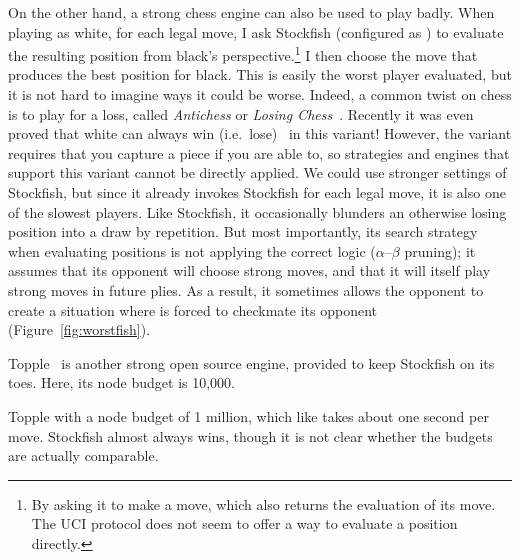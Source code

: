 \documentclass[10pt,preprint,twocolumn]{acmart}
\begin{document}
 On the other hand, a strong chess engine
can also be used to play badly. When playing as white, for each legal
move, I ask Stockfish (configured as ) to evaluate
the resulting position from black's perspective.\footnote{By asking it
  to make a move, which also returns the evaluation of its move. The
  UCI protocol does not seem to offer a way to evaluate a position
  directly.} I then choose the move that produces the best position
for black. This is easily the worst player evaluated, but it is not
hard to imagine ways it could be worse. Indeed, a common twist on
chess is to play for a loss, called {\it Antichess} or {\it Losing
  Chess}~\cite{wikipedialosingchess}. Recently it was even proved that
white can always win (i.e.~lose)~\cite{watkins2017losing} in this
variant! However, the variant requires that you capture a piece if
you are able to, so strategies and engines that support this variant
cannot be directly applied.
We could use stronger settings of Stockfish, but since it already
invokes Stockfish for each legal move, it is also one of the slowest
players. Like Stockfish, it occasionally blunders an otherwise losing
position into a draw by repetition. But most importantly, its search
strategy when evaluating positions is not applying the correct logic
($\alpha$--$\beta$ pruning); it assumes that its opponent will choose
strong moves, and that it will itself play strong moves in future
plies. As a result, it sometimes allows the opponent to create a
situation where  is forced to checkmate its opponent
(Figure~\ref{fig:worstfish}).

 Topple~\cite{topple} is another strong
open source engine, provided to keep Stockfish on its toes. Here,
its node budget is 10,000. \traditional

 Topple with a node budget of 1 million,
which like  takes about one second per move.
Stockfish almost always wins, though it is not clear whether the
budgets are actually comparable. \traditional
\end{document}
